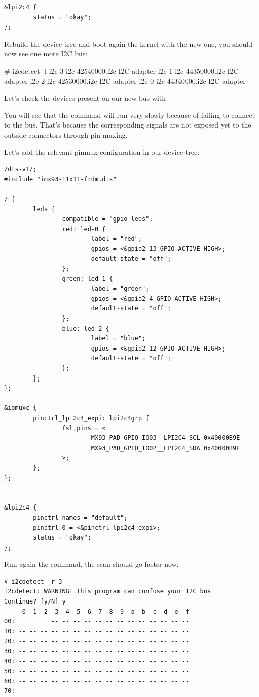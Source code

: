 \begin{verbatim}
&lpi2c4 {
        status = "okay";
};
\end{verbatim}

Rebuild the device-tree and boot again the kernel with the new one, you should
now see one more I2C bus:

\begin{bashinput}
# i2cdetect -l
i2c-3	i2c       	42540000.i2c                    	I2C adapter
i2c-1	i2c       	44350000.i2c                    	I2C adapter
i2c-2	i2c       	42530000.i2c                    	I2C adapter
i2c-0	i2c       	44340000.i2c                    	I2C adapter
\end{bashinput}

Let's check the devices present on our new bus with 

You will see that the command will run very slowly because of failing to connect
to the bus. That’s because the corresponding signals are not exposed yet to the
outside connectors through pin muxing.

Let's add the relevant pinmux configuration in our device-tree:

\begin{verbatim}
/dts-v1/;
#include "imx93-11x11-frdm.dts"

/ {
        leds {
                compatible = "gpio-leds";
                red: led-0 {
                        label = "red";
                        gpios = <&gpio2 13 GPIO_ACTIVE_HIGH>;
                        default-state = "off";
                };
                green: led-1 {
                        label = "green";
                        gpios = <&gpio2 4 GPIO_ACTIVE_HIGH>;
                        default-state = "off";
                };
                blue: led-2 {
                        label = "blue";
                        gpios = <&gpio2 12 GPIO_ACTIVE_HIGH>;
                        default-state = "off";
                };
        };
};

&iomuxc {
        pinctrl_lpi2c4_expi: lpi2c4grp {
                fsl,pins = <
                        MX93_PAD_GPIO_IO03__LPI2C4_SCL 0x40000B9E
                        MX93_PAD_GPIO_IO02__LPI2C4_SDA 0x40000B9E
                >;
        };
};


&lpi2c4 {
        pinctrl-names = "default";
        pinctrl-0 = <&pinctrl_lpi2c4_expi>;
        status = "okay";
};
\end{verbatim}

Run again the  command, the scan should go faster now:
\begin{verbatim}
# i2cdetect -r 3
i2cdetect: WARNING! This program can confuse your I2C bus
Continue? [y/N] y
     0  1  2  3  4  5  6  7  8  9  a  b  c  d  e  f
00:          -- -- -- -- -- -- -- -- -- -- -- -- -- 
10: -- -- -- -- -- -- -- -- -- -- -- -- -- -- -- -- 
20: -- -- -- -- -- -- -- -- -- -- -- -- -- -- -- -- 
30: -- -- -- -- -- -- -- -- -- -- -- -- -- -- -- -- 
40: -- -- -- -- -- -- -- -- -- -- -- -- -- -- -- -- 
50: -- -- -- -- -- -- -- -- -- -- -- -- -- -- -- -- 
60: -- -- -- -- -- -- -- -- -- -- -- -- -- -- -- -- 
70: -- -- -- -- -- -- -- --  
\end{verbatim}

